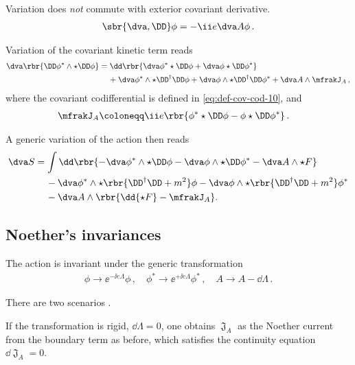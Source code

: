 \documentclass[a4paper]{article}
\begin{document}
Variation does \emph{not} commute with exterior covariant derivative.
\begin{align}
\sbr{\dva, \DD}\phi = -\ii e \dva A\phi\,.
\end{align}

Variation of the covariant kinetic term reads
\begin{align}
\begin{split}
\dva \rbr{\DD \phi^*\wedge\star\DD\phi} &= 
\dd\rbr{\dva\phi^* \star\DD\phi + \dva\phi \star\DD\phi^*} 
\\ &\quad\,+
	\dva\phi^*\wedge\star\DD^{\dagger}\DD\phi +
	\dva\phi\wedge\star\DD^{\dagger}\DD\phi^* +
	\dva A \wedge \mfrakJ_A \,,
\end{split}
\end{align}
where the covariant codifferential is defined in \cref{eq:def-cov-cod-10}, and
\begin{align}
\mfrakJ_A &\coloneqq 
	\ii e \rbr{\phi^* \star\DD\phi - \phi\star\DD\phi^*}\,.
\end{align}

A generic variation of the action then reads
\begin{align}
\dva S &=
\int \dd\rbr{-\dva\phi^*\wedge\star\DD\phi -
\dva\phi\wedge\star\DD\phi^* - \dva A \wedge\star F}
\nonumber \\
&\quad\,-
\dva\phi^*\wedge\star\rbr{\DD^{\dagger}\DD + m^2}\phi -
\dva\phi\wedge\star\rbr{\DD^{\dagger}\DD + m^2}\phi^*
\nonumber \\
&\quad\,-
\dva A\wedge\rbr{\dd{\star F} - \mfrakJ_{A}}.
\end{align}


\subsection{Noether's invariances}


The action is invariant under the generic transformation
\begin{align}
\phi \to \ee^{-\ii e \Lambda} \phi\,,\quad
\phi^* \to \ee^{+\ii e \Lambda} \phi^*\,,\quad
A \to A - \dd \Lambda\,.
\end{align}

There are two scenarios \cite{Avery2015}.

If the transformation is rigid, $\dd \Lambda = 0$, one obtains $\mfrakJ_A$ as 
the Noether current from the boundary term as before, which satisfies the 
continuity equation $\dd \mfrakJ_A = 0$.
\end{document}
